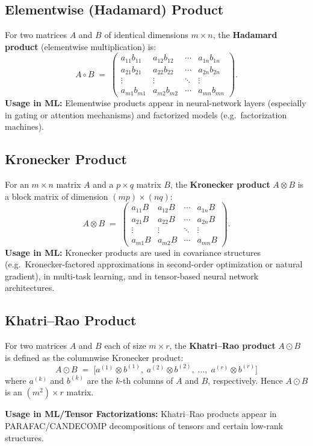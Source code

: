 \subsection{Elementwise (Hadamard) Product}
For two matrices $A$ and $B$ of identical dimensions $m \times n$, 
the \textbf{Hadamard product} (elementwise multiplication) is:
\[
A \circ B \;=\;
\begin{pmatrix}
a_{11} b_{11} & a_{12} b_{12} & \cdots & a_{1n} b_{1n} \\
a_{21} b_{21} & a_{22} b_{22} & \cdots & a_{2n} b_{2n} \\
\vdots        & \vdots        & \ddots & \vdots        \\
a_{m1} b_{m1} & a_{m2} b_{m2} & \cdots & a_{mn} b_{mn}
\end{pmatrix}.
\]
\textbf{Usage in ML:}  
Elementwise products appear in neural-network layers (especially in gating or attention mechanisms) 
and factorized models (e.g.\ factorization machines).

\subsection{Kronecker Product}
For an $m \times n$ matrix $A$ and a $p \times q$ matrix $B$, 
the \textbf{Kronecker product} $A \otimes B$ is a block matrix of dimension 
$(m p) \times (n q)$:
\[
A \otimes B \;=\;
\begin{pmatrix}
a_{11} B & a_{12} B & \cdots & a_{1n} B \\
a_{21} B & a_{22} B & \cdots & a_{2n} B \\
\vdots   & \vdots   & \ddots & \vdots   \\
a_{m1} B & a_{m2} B & \cdots & a_{mn} B
\end{pmatrix}.
\]
\textbf{Usage in ML:}  
Kronecker products are used in covariance structures (e.g.\ Kronecker-factored approximations 
in second-order optimization or natural gradient), in multi-task learning, and in 
tensor-based neural network architectures.

\subsection{Khatri--Rao Product}
For two matrices $A$ and $B$ each of size $m \times r$, 
the \textbf{Khatri--Rao product} $A \odot B$ is defined as the columnwise Kronecker product:
\[
A \odot B \;=\;
\bigl[
a^{(1)} \otimes b^{(1)}, \;
a^{(2)} \otimes b^{(2)}, \;
\ldots,\;
a^{(r)} \otimes b^{(r)}
\bigr]
\]
where $a^{(k)}$ and $b^{(k)}$ are the $k$-th columns of $A$ and $B$, respectively.
Hence $A \odot B$ is an $(m^2) \times r$ matrix. 

\textbf{Usage in ML/Tensor Factorizations:}  
Khatri--Rao products appear in PARAFAC/CANDECOMP decompositions of tensors and certain low-rank structures.
















